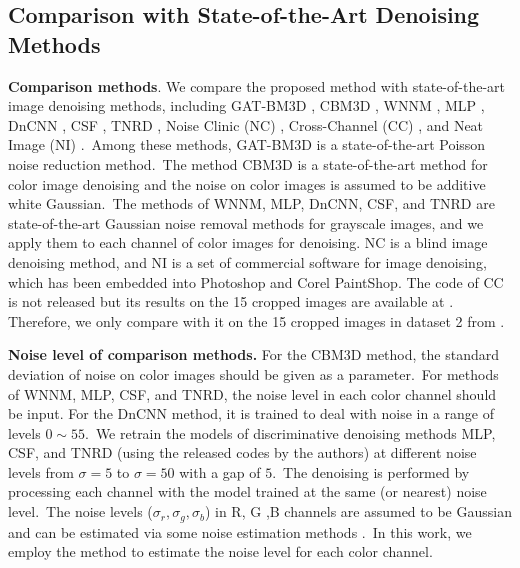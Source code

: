 \subsection{Comparison with State-of-the-Art Denoising Methods}

\textbf{Comparison methods}.
We compare the proposed method with state-of-the-art image denoising methods, including GAT-BM3D \cite{makitalo2013optimal}, CBM3D \cite{cbm3d}, WNNM \cite{wnnm}, MLP \cite{mlp}, DnCNN \cite{dncnn}, CSF \cite{csf}, TNRD \cite{tnrd}, Noise Clinic (NC) \cite{noiseclinic,ncwebsite}, Cross-Channel (CC) \cite{crosschannel2016}, and Neat Image (NI) \cite{neatimage}.\ Among these methods, GAT-BM3D \cite{makitalo2013optimal} is a state-of-the-art Poisson noise reduction method.\ The method CBM3D \cite{cbm3d} is a state-of-the-art method for color image denoising and the noise on color images is assumed to be additive white Gaussian.\ The methods of WNNM, MLP, DnCNN, CSF, and TNRD are state-of-the-art Gaussian noise removal methods for grayscale images, and we apply them to each channel of color images for denoising. NC is a blind image denoising method, and NI is a set of commercial software for image denoising, which has been embedded into Photoshop and Corel PaintShop. The code of CC is not released but its results on the 15 cropped images are available at \cite{crosschannel2016}. Therefore, we only compare with it on the 15 cropped images in dataset 2 from \cite{crosschannel2016}. 

\textbf{Noise level of comparison methods.} 
For the CBM3D method, the standard deviation of noise on color images should be given as a parameter.\ For methods of WNNM, MLP, CSF, and TNRD, the noise level in each color channel should be input. For the DnCNN method, it is trained to deal with noise in a range of levels $0\sim55$.\ We retrain the models of discriminative denoising methods MLP, CSF, and TNRD (using the released codes by the authors) at different noise levels from $\sigma=5$ to $\sigma=50$ with a gap of $5$.\ The denoising is performed by processing each channel with the model trained at the same (or nearest) noise level.\ The noise levels ($\sigma_{r}, \sigma_{g}, \sigma_{b}$) in R, G ,B channels are assumed to be Gaussian and can be estimated via some noise estimation methods \cite{noiselevel,Chen2015ICCV}.\ In this work, we employ the method \cite{Chen2015ICCV} to estimate the noise level for each color channel.

